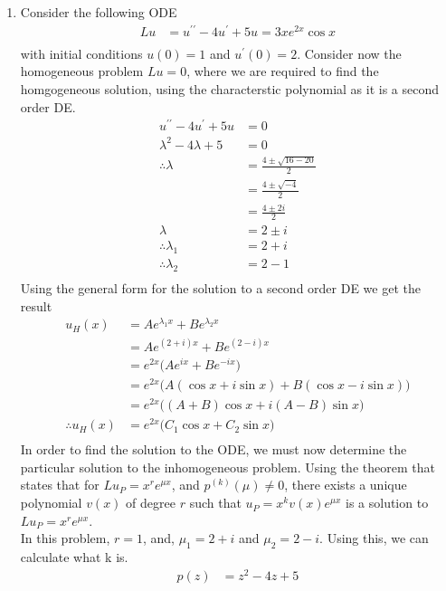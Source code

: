 \documentclass[a4paper]{article}
\newcommand{\ds}{\displaystyle}
\begin{document}
\begin{enumerate}
	\item Consider the following ODE
	\begin{align*}
		Lu & = u^{\prime\prime} - 4u^{\prime} + 5u = 3xe^{2x}\cos{x}\\
	\end{align*}
	with initial conditions $\ds{u(0) = 1}$ and $\ds{u^{\prime}(0) = 2}$. Consider now the homogeneous problem $\ds{Lu=0}$, where we are required to find the homgogeneous solution, using the characterstic polynomial as it is a second order DE.
	\begin{align*}
		u^{\prime\prime} - 4u^{\prime} + 5u & = 0\\
		\lambda^2 - 4\lambda + 5 & = 0\\
		\therefore \lambda & = \frac{4 \pm \sqrt{16-20}}{2}\\
		& = \frac{4 \pm \sqrt{-4}}{2}\\
		& = \frac{4 \pm 2i}{2}\\
		\lambda & = 2 \pm i\\
		\therefore \lambda_1 & = 2 + i\\
		\therefore \lambda_2 & = 2 - 1\\
	\end{align*}
	Using the general form for the solution to a second order DE we get the result
	\begin{align*}
		u_H(x) & = Ae^{\lambda_1x} + Be^{\lambda_2x}\\
		& = Ae^{(2+i)x} + Be^{(2-i)x}\\
		& = e^{2x}\Big(Ae^{ix} + Be^{-ix}\Big)\\
		& = e^{2x}\Big(A(\cos{x} + i\sin{x}) + B(\cos{x} - i\sin{x})\Big)\\
		& = e^{2x}\Big((A+B)\cos{x} + i(A-B)\sin{x}\Big)\\
		\therefore u_H(x) & = e^{2x}\Big(C_1\cos{x} + C_2\sin{x}\Big)\\
	\end{align*}
	In order to find the solution to the ODE, we must now determine the particular solution to the inhomogeneous problem. Using the theorem that states that for $\ds{Lu_P = x^re^{\mu x}}$, and $\ds{p^{(k)}(\mu)\neq 0}$, there exists a unique polynomial $\ds{v(x)}$ of degree $\ds{r}$ such that $\ds{u_P = x^k v(x) e^{\mu x}}$ is a solution to $\ds{Lu_P = x^re^{\mu x}}$. \\
	In this problem, $\ds{r = 1}$, and, $\ds{\mu_1 = 2 + i}$ and $\ds{\mu_2 = 2 - i}$. Using this, we can calculate what k is.
	\begin{align*}
		p(z) & = z^2 - 4z + 5\\

\end{align*}
\end{enumerate}
\end{document}
